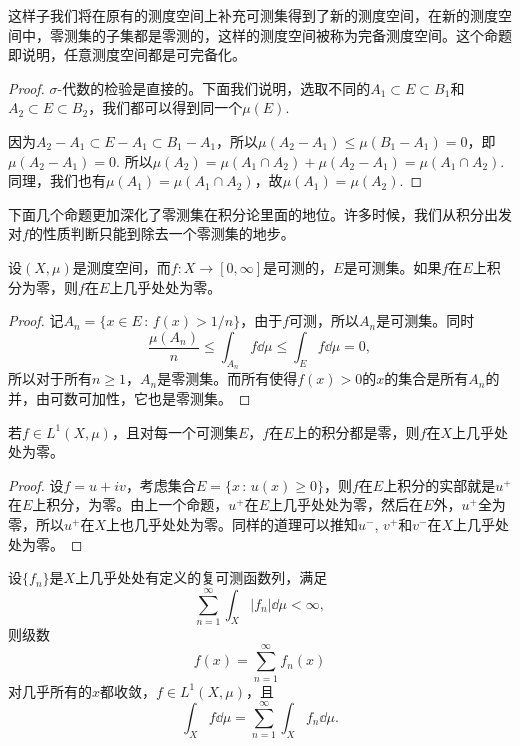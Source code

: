 这样子我们将在原有的测度空间上补充可测集得到了新的测度空间，在新的测度空间中，零测集的子集都是零测的，这样的测度空间被称为完备测度空间。这个命题即说明，任意测度空间都是可完备化。

\begin{proof}
$\sigma$-代数的检验是直接的。下面我们说明，选取不同的$A_1\subset E\subset B_1$和$A_2\subset E\subset B_2$，我们都可以得到同一个$\mu(E)$.

因为$A_2-A_1\subset E-A_1\subset B_1-A_1$，所以$\mu(A_2-A_1)\leq \mu(B_1-A_1)=0$，即$\mu(A_2-A_1)=0$. 所以$\mu(A_2)=\mu(A_1\cap A_2)+\mu(A_2-A_1)=\mu(A_1\cap A_2)$. 同理，我们也有$\mu(A_1)=\mu(A_1\cap A_2)$，故$\mu(A_1)=\mu(A_2)$.
\end{proof}

下面几个命题更加深化了零测集在积分论里面的地位。许多时候，我们从积分出发对$f$的性质判断只能到除去一个零测集的地步。

\begin{pro}
设$(X,\mu)$是测度空间，而$f:X\to [0,\infty]$是可测的，$E$是可测集。如果$f$在$E$上积分为零，则$f$在$E$上几乎处处为零。
\end{pro}

\begin{proof}
记$A_n=\{x\in E\,:\, f(x)>1/n\}$，由于$f$可测，所以$A_n$是可测集。同时
\[
	\frac{\mu(A_n)}n\leq \int_{A_n}f\dd \mu \leq \int_{E}f\dd \mu=0,
\]
所以对于所有$n\geq 1$，$A_n$是零测集。而所有使得$f(x)>0$的$x$的集合是所有$A_n$的并，由可数可加性，它也是零测集。
\end{proof}

\begin{pro}
若$f\in L^1(X,\mu)$，且对每一个可测集$E$，$f$在$E$上的积分都是零，则$f$在$X$上几乎处处为零。
\end{pro}

\begin{proof}
设$f=u+iv$，考虑集合$E=\{x\,:\, u(x)\geq 0\}$，则$f$在$E$上积分的实部就是$u^+$在$E$上积分，为零。由上一个命题，$u^+$在$E$上几乎处处为零，然后在$E$外，$u^+$全为零，所以$u^+$在$X$上也几乎处处为零。同样的道理可以推知$u^-$, $v^+$和$v^-$在$X$上几乎处处为零。
\end{proof}

\begin{thm}[另一个Lebegue控制收敛定理]
设$\{f_n\}$是$X$上几乎处处有定义的复可测函数列，满足
\[
	\sum_{n=1}^\infty\int_X |f_n|\dd \mu<\infty,
\]
则级数
\[
	f(x)=\sum_{n=1}^\infty f_n(x)
\]
对几乎所有的$x$都收敛，$f\in L^1(X,\mu)$，且
\[
	\int_X f\dd \mu=\sum_{n=1}^\infty\int_X f_n\dd \mu.
\]
\end{thm}

